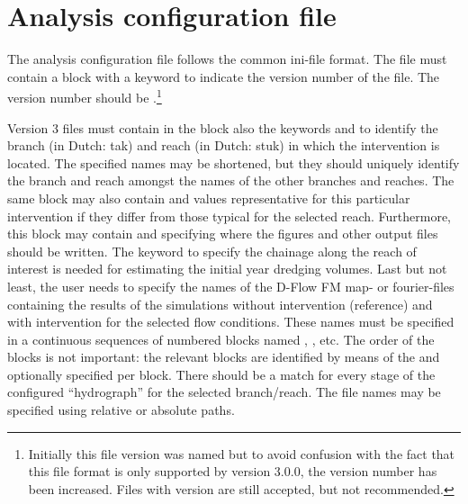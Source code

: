 \section{Analysis configuration file}\label{app:config}

The analysis configuration file follows the common ini-file format.
The file must contain a \keyw{[General]} block with a keyword  to indicate the version number of the file.
The version number should be .\footnote{Initially this file version was named  but to avoid confusion with the fact that this file format is only supported by \dfastmi version 3.0.0, the version number has been increased.
Files with version  are still accepted, but not recommended.}

Version 3 files must contain in the \keyw{[General]} block also the keywords  and  to identify the branch (in Dutch: tak) and reach (in Dutch: stuk) in which the intervention is located.
The specified names may be shortened, but they should uniquely identify the branch and reach amongst the names of the other branches and reaches.
The same block may also contain  and  values representative for this particular intervention if they differ from those typical for the selected reach.
Furthermore, this block may contain  and  specifying where the figures and other output files should be written.
The  keyword to specify the chainage along the reach of interest is needed for estimating the initial year dredging volumes.
Last but not least, the user needs to specify the names of the D-Flow FM map- or fourier-files containing the results of the simulations without intervention (reference) and with intervention for the selected flow conditions.
These names must be specified in a continuous sequences of numbered blocks named , , etc.
The order of the blocks is not important: the relevant blocks are identified by means of the  and optionally  specified per block.
There should be a match for every stage of the configured ``hydrograph'' for the selected branch/reach.
The file names may be specified using relative or absolute paths.

